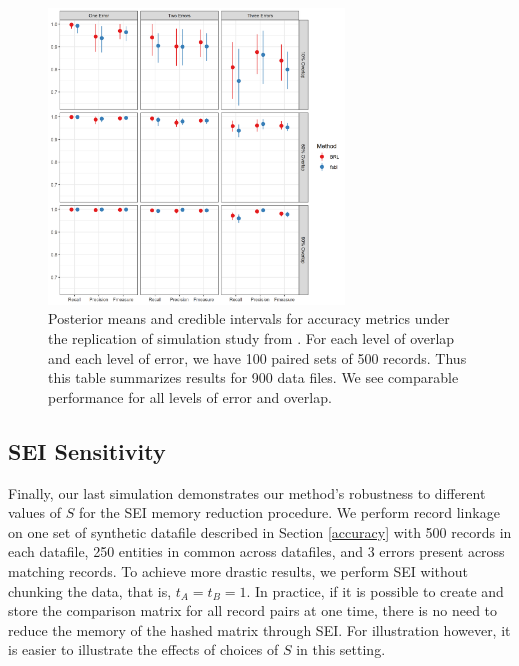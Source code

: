\documentclass[ba]{imsart}
\begin{document}
	\begin{figure}[t]
		\begin{center}
		\includegraphics[width=0.7\textwidth]{finalFigures/figures/sadinle_sim_plot2} 
			\caption{Posterior means and credible intervals for accuracy metrics under the replication of simulation study from \cite{sadinle_bayesian_2017}. For each level of overlap and each level of error, we have 100 paired sets of 500 records. Thus this table summarizes results for 900 data files. We see comparable performance for all levels of error and overlap.}
			\label{fig:sadinle_simulation}
		\end{center}
	\end{figure}

	\hypertarget{SEI-sensitivity}{%
	\subsection{SEI Sensitivity}\label{SEI-sensitivity}}

Finally, our last simulation demonstrates our method's robustness to different values of $S$ for the SEI memory reduction procedure. We perform record linkage on one set of synthetic datafile described in Section \ref{accuracy} with 500 records in each datafile, 250 entities in common across datafiles, and 3 errors present across matching records. To achieve more drastic results, we perform SEI without chunking the data, that is, $t_A = t_B = 1$. In practice, if it is possible to create and store the comparison matrix for all record pairs at one time, there is no need to reduce the memory of the hashed matrix through SEI. For illustration however, it is easier to illustrate the effects of choices of $S$ in this setting. 
\end{document}
